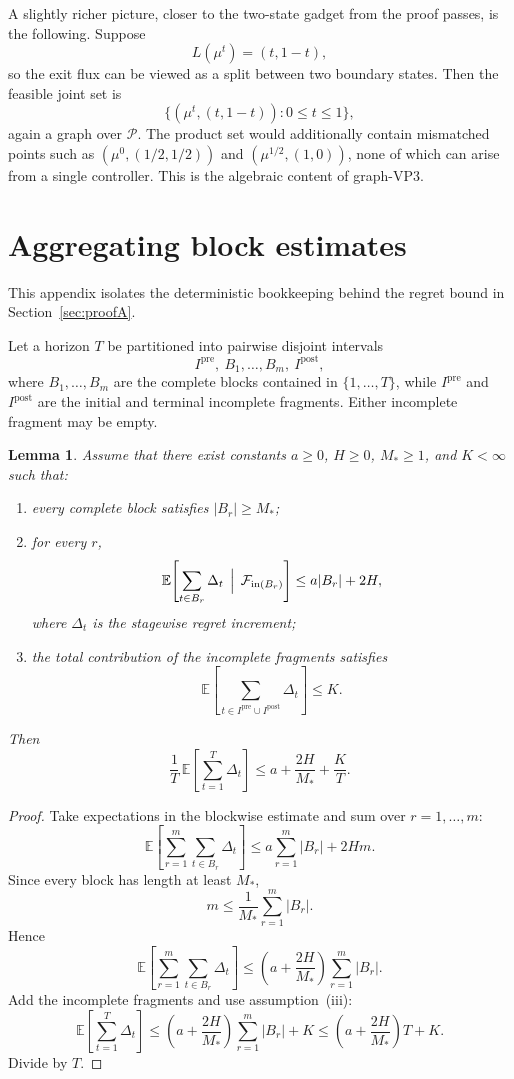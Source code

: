 \documentclass[12pt]{article}
\newtheorem{lemma}[theorem]{Lemma}
\theoremstyle{definition}
\newcommand{\E}{\mathbb{E}}
\newcommand{\1}{\mathbf{1}}
\newcommand{\cP}{\mathcal{P}}
\begin{document}
A slightly richer picture, closer to the two-state gadget from the proof passes, is the
following.  Suppose
\[
L(\mu^t)=(t,1-t),
\]
so the exit flux can be viewed as a split between two boundary states.  Then the feasible
joint set is
\[
\{(\mu^t,(t,1-t)):0\le t\le 1\},
\]
again a graph over \(\cP\).  The product set would additionally contain mismatched points
such as \((\mu^0,(1/2,1/2))\) and \((\mu^{1/2},(1,0))\), none of which can arise from a
single controller.  This is the algebraic content of graph-VP3.

\section{Aggregating block estimates}
\label{app:block-aggregation}

This appendix isolates the deterministic bookkeeping behind the regret bound in
Section~\ref{sec:proofA}.

Let a horizon \(T\) be partitioned into pairwise disjoint intervals
\[
I^{\mathrm{pre}},\ B_1,\dots,B_m,\ I^{\mathrm{post}},
\]
where \(B_1,\dots,B_m\) are the complete blocks contained in \(\{1,\dots,T\}\), while
\(I^{\mathrm{pre}}\) and \(I^{\mathrm{post}}\) are the initial and terminal incomplete
fragments.  Either incomplete fragment may be empty.

\begin{lemma}
\label{lem:aggregation}
Assume that there exist constants \(a\ge 0\), \(H\ge 0\), \(M_*\ge 1\), and \(K<\infty\)
such that:
\begin{enumerate}[label=\textnormal{(\roman*)},leftmargin=2.6em]
\item every complete block satisfies \(|B_r|\ge M_*\);
\item for every \(r\),
\[
\E\!\left[
\sum_{t\in B_r} \Delta_t \,\Bigm|\, \mathcal F_{\mathrm{in}(B_r)}
\right]
\le
a|B_r|+2H,
\]
where \(\Delta_t\) is the stagewise regret increment;
\item the total contribution of the incomplete fragments satisfies
\[
\E\!\left[\sum_{t\in I^{\mathrm{pre}}\cup I^{\mathrm{post}}}\Delta_t\right]\le K.
\]
\end{enumerate}
Then
\[
\frac1T\,\E\!\left[\sum_{t=1}^T \Delta_t\right]
\le
a+\frac{2H}{M_*}+\frac{K}{T}.
\]
\end{lemma}

\begin{proof}
Take expectations in the blockwise estimate and sum over \(r=1,\dots,m\):
\[
\E\!\left[\sum_{r=1}^m\sum_{t\in B_r}\Delta_t\right]
\le
a\sum_{r=1}^m |B_r| + 2Hm.
\]
Since every block has length at least \(M_*\),
\[
m\le \frac{1}{M_*}\sum_{r=1}^m |B_r|.
\]
Hence
\[
\E\!\left[\sum_{r=1}^m\sum_{t\in B_r}\Delta_t\right]
\le
\left(a+\frac{2H}{M_*}\right)\sum_{r=1}^m |B_r|.
\]
Add the incomplete fragments and use assumption~(iii):
\[
\E\!\left[\sum_{t=1}^T\Delta_t\right]
\le
\left(a+\frac{2H}{M_*}\right)\sum_{r=1}^m |B_r| + K
\le
\left(a+\frac{2H}{M_*}\right)T + K.
\]
Divide by \(T\).
\end{proof}
\end{document}

